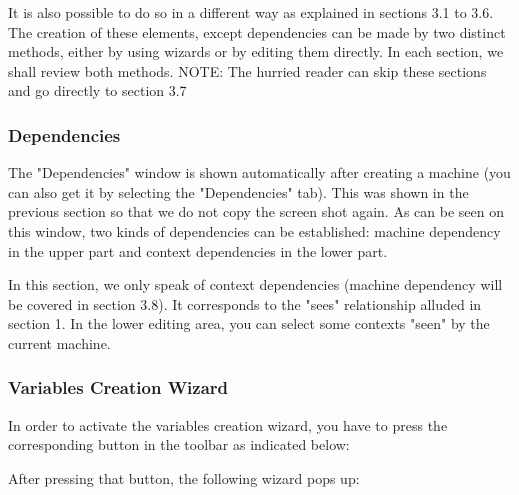 It is also possible to do so in a different way as explained in sections 3.1 to 3.6. The creation of these elements, except dependencies can be made by two distinct methods, either by using wizards or by editing them directly. In each section, we shall review both methods. NOTE: The hurried reader can skip these sections and go directly to section 3.7 

\subsubsection{Dependencies}

The "Dependencies" window is shown automatically after creating a machine (you can also get it by selecting the "Dependencies" tab). This was shown in the previous section so that we do not copy the screen shot again. As can be seen on this window, two kinds of dependencies can be established: machine dependency in the upper part and context dependencies in the lower part.

In this section, we only speak of context dependencies (machine dependency will be covered in section 3.8). It corresponds to the "sees" relationship alluded in section 1. In the lower editing area, you can select some contexts "seen" by the current machine. 

\subsubsection{Variables Creation Wizard}

In order to activate the variables creation wizard, you have to press the corresponding button in the toolbar as indicated below: 


After pressing that button, the following wizard pops up: 


